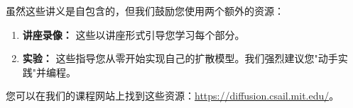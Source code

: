 \begin{remarkbox}[额外资源] 
虽然这些讲义是自包含的，但我们鼓励您使用两个额外的资源：
\begin{enumerate}
    \item \textbf{讲座录像：} 这些以讲座形式引导您学习每个部分。
    \item \textbf{实验：} 这些指导您从零开始实现自己的扩散模型。我们强烈建议您"动手实践"并编程。
\end{enumerate}
您可以在我们的课程网站上找到这些资源：\url{https://diffusion.csail.mit.edu/}。
\end{remarkbox}



